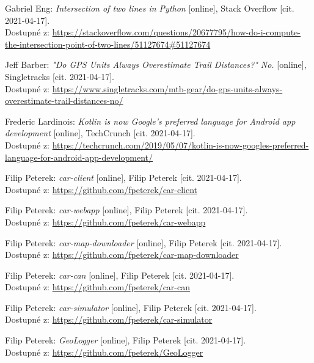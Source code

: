 \documentclass[czech, bachelor]{diploma}
\begin{document}
\begin{thebibliography}{20}
Gabriel Eng: \textit{Intersection of two lines in Python} [online], Stack Overflow [cit. 2021-04-17]. \\
Dostupné z:
\url{https://stackoverflow.com/questions/20677795/how-do-i-compute-the-intersection-point-of-two-lines/51127674\#51127674}

Jeff Barber: \textit{"Do GPS Units Always Overestimate Trail Distances?" No.} [online], Singletracks [cit. 2021-04-17]. \\
Dostupné z:
\url{https://www.singletracks.com/mtb-gear/do-gps-units-always-overestimate-trail-distances-no/}

Frederic Lardinois: \textit{Kotlin is now Google's preferred language for Android app development} [online],
TechCrunch [cit. 2021-04-17]. \\
Dostupné z:
\url{https://techcrunch.com/2019/05/07/kotlin-is-now-googles-preferred-language-for-android-app-development/}

Filip Peterek: \textit{car-client} [online], Filip Peterek [cit. 2021-04-17]. \\
Dostupné z:
\url{https://github.com/fpeterek/car-client}

Filip Peterek: \textit{car-webapp} [online], Filip Peterek [cit. 2021-04-17]. \\
Dostupné z:
\url{https://github.com/fpeterek/car-webapp}

Filip Peterek: \textit{car-map-downloader} [online], Filip Peterek [cit. 2021-04-17]. \\
Dostupné z:
\url{https://github.com/fpeterek/car-map-downloader}

Filip Peterek: \textit{car-can} [online], Filip Peterek [cit. 2021-04-17]. \\
Dostupné z:
\url{https://github.com/fpeterek/car-can}

Filip Peterek: \textit{car-simulator} [online], Filip Peterek [cit. 2021-04-17]. \\
Dostupné z:
\url{https://github.com/fpeterek/car-simulator}

Filip Peterek: \textit{GeoLogger} [online], Filip Peterek [cit. 2021-04-17]. \\
Dostupné z:
\url{https://github.com/fpeterek/GeoLogger}

\end{thebibliography}
\end{document}
